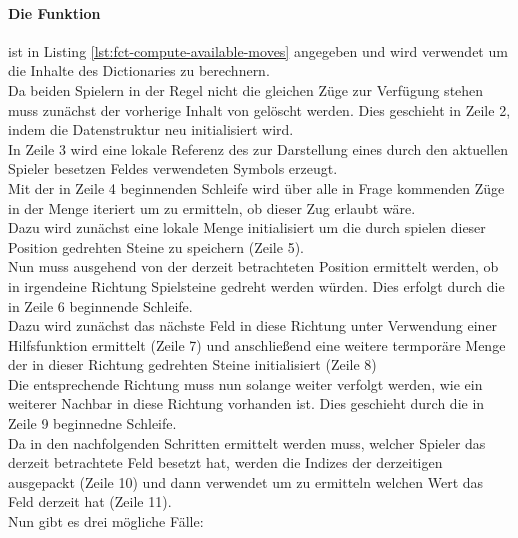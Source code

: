 \paragraph{Die Funktion }
 ist in Listing \ref{lst:fct-compute-available-moves} angegeben und wird verwendet um die Inhalte des Dictionaries  zu berechnern.
\\Da beiden Spielern in der Regel nicht die gleichen Züge zur Verfügung stehen muss zunächst der vorherige Inhalt von  gelöscht werden. Dies geschieht in Zeile 2, indem die Datenstruktur neu initialisiert wird.
\\In Zeile 3 wird eine lokale Referenz des zur Darstellung eines durch den aktuellen Spieler besetzen Feldes verwendeten Symbols erzeugt.
\\Mit der in Zeile 4 beginnenden Schleife wird über alle in Frage kommenden Züge in der Menge  iteriert um zu ermitteln, ob dieser Zug erlaubt wäre.
\\Dazu wird zunächst eine lokale Menge initialisiert um die durch spielen dieser Position gedrehten Steine zu speichern (Zeile 5).
\\Nun muss ausgehend von der derzeit betrachteten Position ermittelt werden, ob in irgendeine Richtung Spielsteine gedreht werden würden. Dies erfolgt durch die in Zeile 6 beginnende Schleife.
\\Dazu wird zunächst das nächste Feld in diese Richtung unter Verwendung einer Hilfsfunktion ermittelt (Zeile 7) und anschließend eine weitere termporäre Menge der in dieser Richtung gedrehten Steine initialisiert (Zeile 8)
\\Die entsprechende Richtung muss nun solange weiter verfolgt werden, wie ein weiterer Nachbar in diese Richtung vorhanden ist. Dies geschieht durch die in Zeile 9 beginnedne Schleife.
\\Da in den nachfolgenden Schritten ermittelt werden muss, welcher Spieler das derzeit betrachtete Feld besetzt hat, werden die Indizes der derzeitigen  ausgepackt (Zeile 10) und dann verwendet um zu ermitteln welchen Wert das Feld derzeit hat (Zeile 11).
\\Nun gibt es drei mögliche Fälle:
